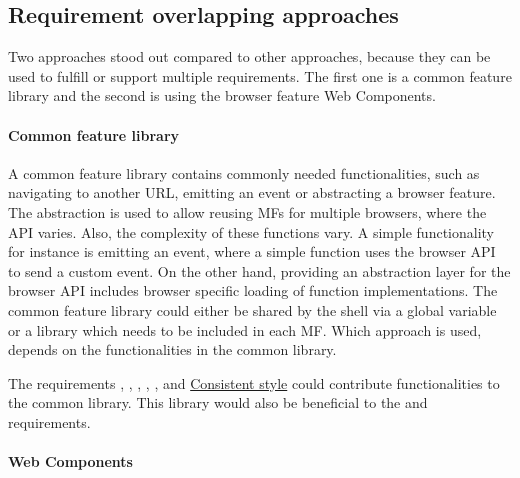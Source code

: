 \subsection{Requirement overlapping approaches}

Two approaches stood out compared to other approaches, because they can be used to fulfill or support multiple requirements.
The first one is a common feature library and the second is using the browser feature Web Components.



\paragraph{Common feature library}\label{cha:requirements_conclusion_commonlibrary}

A common feature library contains commonly needed functionalities, such as navigating to another \ac{URL}, emitting an event or abstracting a browser feature.
The abstraction is used to allow reusing \acp{MF} for multiple browsers, where the \ac{API} varies.
Also, the complexity of these functions vary.
A simple functionality for instance is emitting an event, where a simple function uses the browser \ac{API} to send a custom event.
On the other hand, providing an abstraction layer for the browser \ac{API} includes browser specific loading of function implementations.
The common feature library could either be shared by the shell via a global variable or a library which needs to be included in each \ac{MF}.
Which approach is used, depends on the functionalities in the common library.

The requirements \textit{}, \textit{}, \textit{}, \textit{}, \textit{}, \textit{} and \hyperref[cha:requirement_detail_style]{Consistent style} could contribute functionalities to the common library.
This library would also be beneficial to the \textit{} and \textit{} requirements.



\paragraph{Web Components}\label{cha:requirements_conclusion_webcomponents}

